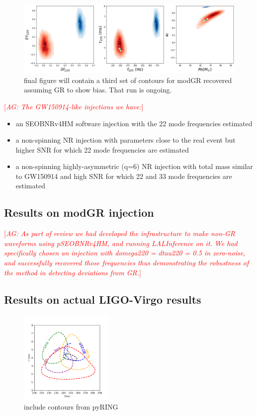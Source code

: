 \documentclass[twocolumn,prd,superscriptaddress,amsfonts,amssymb,amsmath,preprintnumbers]{revtex4-1}
\newcommand{\abhi}[1]{\textcolor{red}{[\textit{AG: #1}]}}
\begin{document}
\begin{figure}
	\includegraphics[width=\textwidth]{figures/GW150914_swinj_GR_vs_modGR.png}
	\caption{final figure will contain a third set of contours for modGR recovered assuming GR to show bias. That run is ongoing.}
\end{figure}

\abhi{The GW150914-like injections we have:}
\begin{itemize}
\item{an SEOBNRv4HM software injection with the 22 mode frequencies estimated}
\item{a non-spinning NR injection with parameters close to the real event but higher SNR for which 22 mode frequencies are estimated}
\item{a non-spinning highly-asymmetric (q=6) NR injection with total mass similar to GW150914 and high SNR for which 22 and 33 mode frequencies are estimated}
\end{itemize}


\subsection{Results on modGR injection}

\abhi{As part of review we had developed the infrastructure to make non-GR waveforms using pSEOBNRv4HM, and running LALInference on it. We had specifically chosen an injection with domega220 = dtau220  = 0.5 in zero-noise, and successfully recovered those frequencies thus demonstrating the robustness of the method in detecting deviations from GR.}

\subsection{Results on actual LIGO-Virgo results}

\begin{figure}
	\includegraphics[width=0.4\textwidth]{figures/GW150914.png}
	\caption{include contours from pyRING}
\end{figure}
\end{document}
